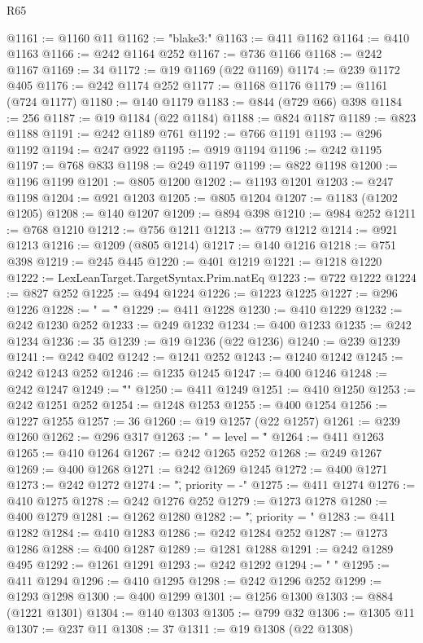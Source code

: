 \begin{lexlean}{R65}
\begin{coremodule}
@1161 := @1160 @11
@1162 := "blake3:"
@1163 := @411 @1162
@1164 := @410 @1163
@1166 := @242 @1164 @252
@1167 := @736 @1166
@1168 := @242 @1167
@1169 := 34
@1172 := @19 @1169 (@22 @1169)
@1174 := @239 @1172 @405
@1176 := @242 @1174 @252
@1177 := @1168 @1176
@1179 := @1161 (@724 @1177)
@1180 := @140 @1179
@1183 := @844 (@729 @66) @398
@1184 := 256
@1187 := @19 @1184 (@22 @1184)
@1188 := @824 @1187
@1189 := @823 @1188
@1191 := @242 @1189 @761
@1192 := @766 @1191
@1193 := @296 @1192
@1194 := @247 @922
@1195 := @919 @1194
@1196 := @242 @1195
@1197 := @768 @833
@1198 := @249 @1197
@1199 := @822 @1198
@1200 := @1196 @1199
@1201 := @805 @1200
@1202 := @1193 @1201
@1203 := @247 @1198
@1204 := @921 @1203
@1205 := @805 @1204
@1207 := @1183 (@1202 @1205)
@1208 := @140 @1207
@1209 := @894 @398
@1210 := @984 @252
@1211 := @768 @1210
@1212 := @756 @1211
@1213 := @779 @1212
@1214 := @921 @1213
@1216 := @1209 (@805 @1214)
@1217 := @140 @1216
@1218 := @751 @398
@1219 := @245 @445
@1220 := @401 @1219
@1221 := @1218 @1220
@1222 := LexLeanTarget.TargetSyntax.Prim.natEq
@1223 := @722 @1222
@1224 := @827 @252
@1225 := @494 @1224
@1226 := @1223 @1225
@1227 := @296 @1226
@1228 := " = \""
@1229 := @411 @1228
@1230 := @410 @1229
@1232 := @242 @1230 @252
@1233 := @249 @1232
@1234 := @400 @1233
@1235 := @242 @1234
@1236 := 35
@1239 := @19 @1236 (@22 @1236)
@1240 := @239 @1239
@1241 := @242 @402
@1242 := @1241 @252
@1243 := @1240 @1242
@1245 := @242 @1243 @252
@1246 := @1235 @1245
@1247 := @400 @1246
@1248 := @242 @1247
@1249 := "\"\n"
@1250 := @411 @1249
@1251 := @410 @1250
@1253 := @242 @1251 @252
@1254 := @1248 @1253
@1255 := @400 @1254
@1256 := @1227 @1255
@1257 := 36
@1260 := @19 @1257 (@22 @1257)
@1261 := @239 @1260
@1262 := @296 @317
@1263 := " = { level = \""
@1264 := @411 @1263
@1265 := @410 @1264
@1267 := @242 @1265 @252
@1268 := @249 @1267
@1269 := @400 @1268
@1271 := @242 @1269 @1245
@1272 := @400 @1271
@1273 := @242 @1272
@1274 := "\", priority = -"
@1275 := @411 @1274
@1276 := @410 @1275
@1278 := @242 @1276 @252
@1279 := @1273 @1278
@1280 := @400 @1279
@1281 := @1262 @1280
@1282 := "\", priority = "
@1283 := @411 @1282
@1284 := @410 @1283
@1286 := @242 @1284 @252
@1287 := @1273 @1286
@1288 := @400 @1287
@1289 := @1281 @1288
@1291 := @242 @1289 @495
@1292 := @1261 @1291
@1293 := @242 @1292
@1294 := " }\n"
@1295 := @411 @1294
@1296 := @410 @1295
@1298 := @242 @1296 @252
@1299 := @1293 @1298
@1300 := @400 @1299
@1301 := @1256 @1300
@1303 := @884 (@1221 @1301)
@1304 := @140 @1303
@1305 := @799 @32
@1306 := @1305 @11
@1307 := @237 @11
@1308 := 37
@1311 := @19 @1308 (@22 @1308)

\end{coremodule}
\end{lexlean}

